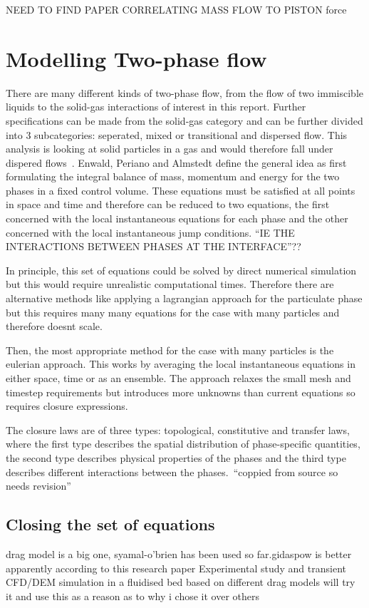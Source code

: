 NEED TO FIND PAPER CORRELATING MASS FLOW TO PISTON force
\newpage
\section{Modelling Two-phase flow}
There are many different kinds of two-phase flow, from the flow of two immiscible liquids to the solid-gas interactions of interest in this report. Further specifications can be made from the solid-gas category and can be further divided into 3 subcategories: seperated, mixed or transitional and dispersed flow. This analysis is looking at solid particles in a gas and would therefore fall under dispered flows~\cite{enwald1996eulerian}. Enwald, Periano and Almstedt define the general idea as first formulating the integral balance of mass, momentum and energy for the two phases in a fixed control volume. These equations must be satisfied at all points in space and time and therefore can be reduced to two equations, the first concerned with the local instantaneous equations for each phase and the other concerned with the local instantaneous jump conditions. ``IE THE INTERACTIONS BETWEEN PHASES AT THE INTERFACE''??

In principle, this set of equations could be solved by direct numerical simulation but this would require unrealistic computational times. Therefore there are alternative methods like applying a lagrangian approach for the particulate phase but this requires many many equations for the case with many particles and therefore doesnt scale.

Then, the most appropriate method for the case with many particles is the eulerian approach. This works by averaging the local instantaneous equations in either space, time or as an ensemble. The approach relaxes the small mesh and timestep requirements but introduces more unknowns than current equations so requires closure expressions.

The closure laws are of three types: topological, constitutive and transfer laws, where the first type describes the spatial distribution of phase-specific quantities, the second type describes physical properties of the phases and the third type describes different interactions between the phases.~``coppied from source so needs revision''

\newpage
\subsection{Closing the set of equations}
drag model is a big one, syamal-o'brien has been used so far.gidaspow is better apparently according to this research paper Experimental study and transient CFD/DEM
simulation in a fluidised bed based on different
drag models
will try it and use this as a reason as to why i chose it over others

